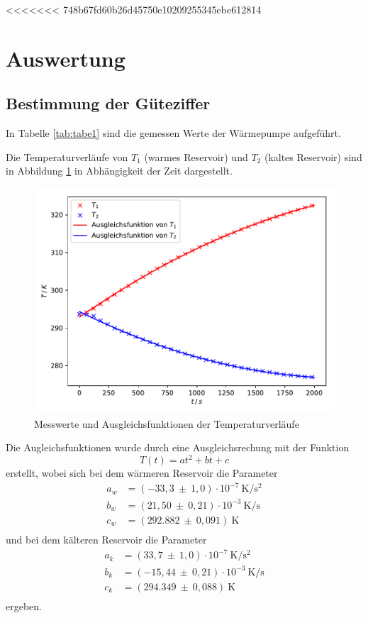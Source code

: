 <<<<<<< 748b67fd60b26d45750e10209255345ebe612814
\section{Auswertung}
\label{sec:Auswertung}
\subsection{Bestimmung der Güteziffer}
In Tabelle \ref{tab:tabe1} sind die gemessen Werte der Wärmepumpe aufgeführt.

\noindent Die Temperaturverläufe von $ T_1 $ (warmes Reservoir) und $ T_2 $ (kaltes
Reservoir) sind in Abbildung \ref{fig:plot1} in Abhängigkeit der Zeit dargestellt.
\begin{figure}[H]
  \centering
  \includegraphics{plot1.pdf}
  \caption{Messwerte und Ausgleichsfunktionen der Temperaturverläufe}
  \label{fig:plot1}
\end{figure}
Die Augleichsfunktionen wurde durch eine Ausgleichsrechung mit der Funktion
\begin{equation}
  T(t) = at^2 +bt +c
\end{equation}
erstellt, wobei sich bei dem wärmeren Reservoir die Parameter
\begin{align*}
  a_w &= (-33,3 \: \pm \: 1,0) \cdot 10^{-7} \: \si{\kelvin\per\second\squared}\\
  b_w &= (21,50 \: \pm \: 0,21) \cdot 10^{-3} \: \si{\kelvin\per\second}\\
  c_w &= (292.882 \: \pm \: 0,091) \: \si{\kelvin} \\
\end{align*}
und bei dem kälteren Reservoir die Parameter
\begin{align*}
  a_k &= (33,7 \: \pm \: 1,0) \cdot 10^{-7} \: \si{\kelvin\per\second\squared}\\
  b_k &= (-15,44 \: \pm \: 0,21) \cdot 10^{-3} \: \si{\kelvin\per\second}\\
  c_k &= (294.349 \: \pm \: 0,088) \: \si{\kelvin}\\
\end{align*}
ergeben.

